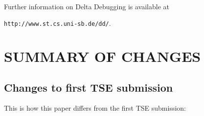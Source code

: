 \documentclass{acm_proc_article-sp}
\newcommand{\TSE}        {{\small TSE}\xspace}
\theoremstyle{plain}
\begin{document}
Further information on Delta Debugging is available at
\begin{center}
\texttt{http://www.st.cs.uni-sb.de/dd/}\enspace.
\end{center}
\medskip




\clearpage

\section*{SUMMARY OF CHANGES}

\subsection*{Changes to first TSE submission}
\medskip

This is how this paper differs from the first \TSE submission:
\end{document}
